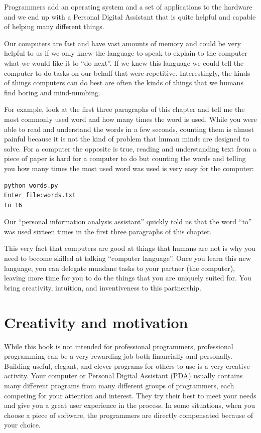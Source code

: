 \documentclass[10pt]{book}
\begin{document}
Programmers add an operating system and a set of applications
to the hardware and we end up with a Personal Digital
Assistant that is quite helpful and capable of helping
many different things.

Our computers are fast and have vast amounts of memory and 
could be very helpful to us if we only knew the language to
speak to explain to the computer what we would like it to 
``do next''.  If we knew this language we could tell the 
computer to do tasks on our behalf that were repetitive.  
Interestingly, the kinds of things computers can do best
are often the kinds of things that we humans find boring
and mind-numbing.

For example, look at the first three paragraphs of this
chapter and tell me the most commonly used word and how
many times the word is used.  While you were able to read
and understand the words in a few seconds, counting them
is almost painful because it is not the kind of problem 
that human minds are designed to solve.  For a computer
the opposite is true, reading and understanding text 
from a piece of paper is hard for a computer to do 
but counting the words and telling you how many times
the most used word was used is very easy for the
computer:

\beforeverb
\begin{verbatim}
python words.py
Enter file:words.txt
to 16
\end{verbatim}
\afterverb
%
Our ``personal information analysis assistant'' quickly 
told us that the word ``to'' was used sixteen times in the
first three paragraphs of this chapter.

This very fact that computers are good at things 
that humans are not is why you need to become
skilled at talking ``computer language''.  Once you learn
this new language, you can delegate mundane tasks
to your partner (the computer), leaving more time 
for you to do the 
things that you are uniquely suited for.  You bring 
creativity, intuition, and inventiveness to this
partnership.  

\section{Creativity and motivation}

While this book is not intended for professional programmers, professional
programming can be a very rewarding job both financially and personally.
Building useful, elegant, and clever programs for others to use is a very
creative activity.  Your computer or Personal Digital Assistant (PDA) 
usually contains many different programs from many different groups of 
programmers, each competing for your attention and interest.  They try 
their best to meet your needs and give you a great user experience in the
process.   In some situations, when you choose a piece of software, the 
programmers are directly compensated because of your choice.
\end{document}
